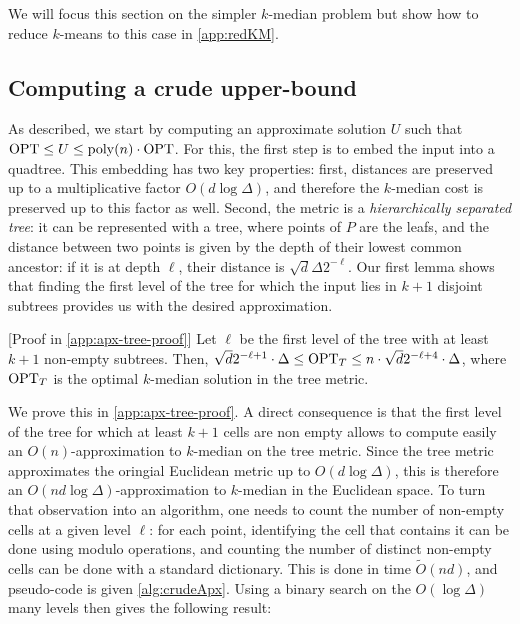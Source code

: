 We will focus this section on the simpler $k$-median problem but show how to reduce $k$-means to this case in \cref{app:redKM}.


\subsection{Computing a crude upper-bound}
\label{ssec:crude_bound}

As described, we start by computing an approximate solution $U$ such that $\text{OPT} \leq U \leq \operatorname{poly}(n) \cdot \text{OPT}$. For this, the first step is to embed the input
into a quadtree. This embedding has two key properties: first, distances are preserved up to a multiplicative factor $O(d \log \Delta)$, and therefore the
$k$-median cost is preserved up to this factor as well. Second, the metric is a \emph{hierarchically separated tree}: it can be represented with a tree, where
points of $P$ are the leafs, and the distance between two points is given by the depth of their lowest common ancestor: if it is at depth $\ell$, their distance
is $\sqrt{d} \Delta 2^{-\ell}$.  Our first lemma shows that finding the first level of the tree for which the input lies in $k+1$ disjoint subtrees provides us
with the desired approximation. 

\begin{lemma}\label{lem:apxTree} [Proof in \cref{app:apx-tree-proof}]
Let $\ell$ be the first level of the tree with at least $k+1$ non-empty subtrees. Then, $\sqrt{d}2^{-\ell+1} \cdot \Delta \leq
\text{OPT}_T \leq n \cdot \sqrt{d}2^{-\ell+4} \cdot \Delta$, where $\text{OPT}_T$ is the optimal $k$-median solution in the tree metric.

\end{lemma}

We prove this in \cref{app:apx-tree-proof}. A direct consequence  is that the first level of the tree for which at least $k+1$ cells are non empty allows to
compute easily an $O(n)$-approximation to $k$-median on the tree metric. Since the tree metric approximates the oringial Euclidean metric up to $O(d \log
\Delta)$, this is therefore an $O(n d \log \Delta)$-approximation to $k$-median in the Euclidean space.  To turn that observation into an algorithm, one needs
to count the number of non-empty cells at a given level $\ell$: for each point, identifying the cell that contains it can be done using modulo operations, and
counting the number of distinct non-empty cells can be done with a standard dictionary.  This is done in time $\tilde O(nd)$, and pseudo-code is given
\cref{alg:crudeApx}. Using a binary search on the $O(\log \Delta)$ many levels then gives the following result:

